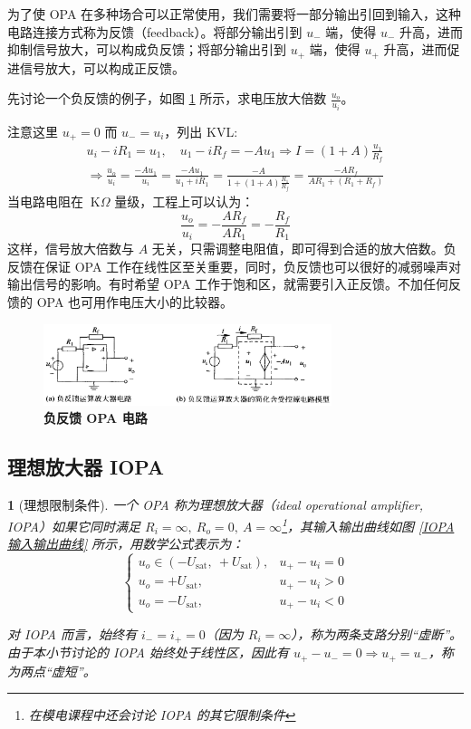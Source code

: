 \documentclass[UTF8]{report}
\def\kO{\ \mathrm{K}\Omega}
\theoremstyle{MyLineTheoremStyle} %
\theoremstyle{MyBlockTheoremStyle} %
\theoremstyle{MySubsubsectionStyle} %
\newtheorem{definition}{}
\begin{document}
为了使 OPA 在多种场合可以正常使用，我们需要将一部分输出引回到输入，这种电路连接方式称为反馈（feedback）。将部分输出引到 $u_-$ 端，使得 $u_-$ 升高，进而抑制信号放大，可以构成负反馈；将部分输出引到 $u_+$ 端，使得 $u_+$ 升高，进而促进信号放大，可以构成正反馈。


先讨论一个负反馈的例子，如图 \ref{负反馈 OPA 电路} 所示，求电压放大倍数 $\frac{u_o}{u_i}$。

注意这里 $u_+ = 0$ 而 $u_- = u_i$，列出 KVL: 
\begin{gather}
u_i - iR_1 = u_1,\quad u_1 - iR_f = -Au_1 \Longrightarrow I =(1+A) \frac{u_1}{R_f} \\ 
\Longrightarrow \frac{u_o}{u_i} = \frac{-Au_1}{u_i} = \frac{-Au_1}{u_1+iR_1} = \frac{-A}{1+(1+A)\frac{R_1}{R_f}} = \frac{-AR_f}{AR_1 + (R_1 + R_f)}
\end{gather}
当电路电阻在 $\kO$ 量级，工程上可以认为：
\begin{equation}
\frac{u_o}{u_i} = -\frac{AR_f}{AR_1} = -\frac{R_f}{R_1}
\end{equation}
这样，信号放大倍数与 $A$ 无关，只需调整电阻值，即可得到合适的放大倍数。负反馈在保证 OPA 工作在线性区至关重要，同时，负反馈也可以很好的减弱噪声对输出信号的影响。有时希望 OPA 工作于饱和区，就需要引入正反馈。不加任何反馈的 OPA 也可用作电压大小的比较器。

\begin{figure}[H]\centering
\includegraphics[width=0.75\textwidth]{assets/1,2/image (51).png}
\caption{\textbf{负反馈 OPA 电路}}\label{负反馈 OPA 电路}
\end{figure}


\subsection{理想放大器 IOPA}

\begin{definition}[理想限制条件]
一个 OPA 称为理想放大器（ideal operational amplifier, IOPA）如果它同时满足 $R_i = \infty,\ R_o = 0,\ A = \infty$\footnote{在模电课程中还会讨论 IOPA 的其它限制条件}，其输入输出曲线如图 \ref{IOPA 输入输出曲线} 所示，用数学公式表示为：
\begin{equation}
\begin{cases}
    u_o \in (-U_{\text{sat}},\ +U_{\text{sat}}), &u_+ - u_i = 0 \\
    u_o = +U_{\text{sat}}, &u_+ - u_i > 0 \\
    u_o = -U_{\text{sat}}, &u_+ - u_i < 0 
\end{cases}
\end{equation}

对 IOPA 而言，始终有 $i_- = i_+ = 0$（因为 $R_i = \infty$），称为两条支路分别“虚断”。由于本小节讨论的 IOPA 始终处于线性区，因此有 $u_+ - u_- = 0 \Longrightarrow u_+ = u_- $，称为两点“虚短”。
\end{definition}
\end{document}
